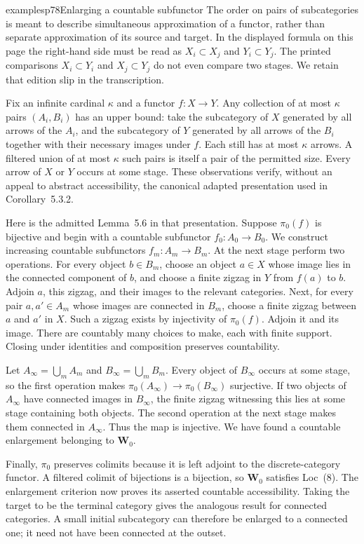 \begin{dcomment}{examples}{p78}{Enlarging a countable subfunctor}
The order on pairs of subcategories is meant to describe simultaneous approximation of a functor, rather than separate approximation of its source and target. In the displayed formula on this page the right-hand side must be read as $X_i\subset X_j$ and $Y_i\subset Y_j$. The printed comparisons $X_i\subset Y_i$ and $X_j\subset Y_j$ do not even compare two stages. We retain that edition slip in the transcription.

Fix an infinite cardinal $\kappa$ and a functor $f:X\to Y$. Any collection of at most $\kappa$ pairs $(A_i,B_i)$ has an upper bound: take the subcategory of $X$ generated by all arrows of the $A_i$, and the subcategory of $Y$ generated by all arrows of the $B_i$ together with their necessary images under $f$. Each still has at most $\kappa$ arrows. A filtered union of at most $\kappa$ such pairs is itself a pair of the permitted size. Every arrow of $X$ or $Y$ occurs at some stage. These observations verify, without an appeal to abstract accessibility, the canonical adapted presentation used in Corollary~5.3.2.

Here is the admitted Lemma~5.6 in that presentation. Suppose $\pi_0(f)$ is bijective and begin with a countable subfunctor $f_0:A_0\to B_0$. We construct increasing countable subfunctors $f_m:A_m\to B_m$. At the next stage perform two operations. For every object $b\in B_m$, choose an object $a\in X$ whose image lies in the connected component of $b$, and choose a finite zigzag in $Y$ from $f(a)$ to $b$. Adjoin $a$, this zigzag, and their images to the relevant categories. Next, for every pair $a,a'\in A_m$ whose images are connected in $B_m$, choose a finite zigzag between $a$ and $a'$ in $X$. Such a zigzag exists by injectivity of $\pi_0(f)$. Adjoin it and its image. There are countably many choices to make, each with finite support. Closing under identities and composition preserves countability.

Let $A_\infty=\bigcup_m A_m$ and $B_\infty=\bigcup_m B_m$. Every object of $B_\infty$ occurs at some stage, so the first operation makes $\pi_0(A_\infty)\to\pi_0(B_\infty)$ surjective. If two objects of $A_\infty$ have connected images in $B_\infty$, the finite zigzag witnessing this lies at some stage containing both objects. The second operation at the next stage makes them connected in $A_\infty$. Thus the map is injective. We have found a countable enlargement belonging to $\mathbf W_0$.

Finally, $\pi_0$ preserves colimits because it is left adjoint to the discrete-category functor. A filtered colimit of bijections is a bijection, so $\mathbf W_0$ satisfies Loc~(8). The enlargement criterion now proves its asserted countable accessibility. Taking the target to be the terminal category gives the analogous result for connected categories. A small initial subcategory can therefore be enlarged to a connected one; it need not have been connected at the outset.
\end{dcomment}

